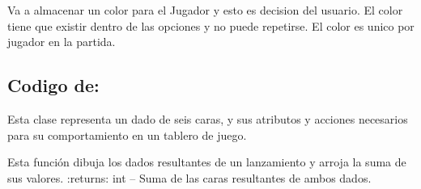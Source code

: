 \documentclass[letterpaper,10pt,english]{sphinxmanual}
\begin{document}
\begin{fulllineitems}
\begin{fulllineitems}
\end{fulllineitems}


\begin{fulllineitems}
\label{\detokenize{codigo:arbitro.Arbitro.setColorJugador}}
Va a almacenar un color para el Jugador y esto es decision del usuario. El color tiene que existir dentro de las opciones
y no puede repetirse. El color es unico por jugador en la partida.

\end{fulllineitems}


\end{fulllineitems}



\subsection{Codigo de: }
\label{\detokenize{codigo:module-dado}}\label{\detokenize{codigo:codigo-de-dado}}

\begin{fulllineitems}
\label{\detokenize{codigo:dado.Dado}}
Esta clase representa un dado de seis caras, y sus atributos y acciones necesarios 
para su comportamiento en un tablero de juego.

\begin{fulllineitems}
\label{\detokenize{codigo:dado.Dado.lanzar}}
Esta función dibuja los dados resultantes de un lanzamiento y arroja la suma de sus valores.
:returns:  int -- Suma de las caras resultantes de ambos dados.

\end{fulllineitems}


\end{fulllineitems}

\end{document}
